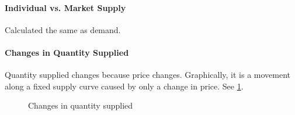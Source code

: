 \paragraph{Individual vs. Market Supply}
Calculated the same as demand.

\paragraph{Changes in Quantity Supplied} Quantity supplied changes because price changes. Graphically, it is a movement along a fixed supply curve caused by only a change in price. See \cref{fig:changes_in_quantity_supplied}.
\begin{figure}[ht]
	\centering
	\caption{Changes in quantity supplied}
	\label{fig:changes_in_quantity_supplied}
\end{figure}


